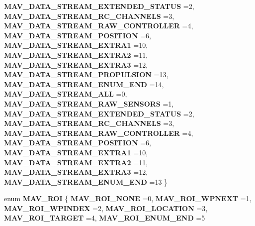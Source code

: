 \begin{DoxyCompactItemize}
\textbf{ M\+A\+V\+\_\+\+D\+A\+T\+A\+\_\+\+S\+T\+R\+E\+A\+M\+\_\+\+E\+X\+T\+E\+N\+D\+E\+D\+\_\+\+S\+T\+A\+T\+US} =2, 
\textbf{ M\+A\+V\+\_\+\+D\+A\+T\+A\+\_\+\+S\+T\+R\+E\+A\+M\+\_\+\+R\+C\+\_\+\+C\+H\+A\+N\+N\+E\+LS} =3, 
\newline
\textbf{ M\+A\+V\+\_\+\+D\+A\+T\+A\+\_\+\+S\+T\+R\+E\+A\+M\+\_\+\+R\+A\+W\+\_\+\+C\+O\+N\+T\+R\+O\+L\+L\+ER} =4, 
\textbf{ M\+A\+V\+\_\+\+D\+A\+T\+A\+\_\+\+S\+T\+R\+E\+A\+M\+\_\+\+P\+O\+S\+I\+T\+I\+ON} =6, 
\textbf{ M\+A\+V\+\_\+\+D\+A\+T\+A\+\_\+\+S\+T\+R\+E\+A\+M\+\_\+\+E\+X\+T\+R\+A1} =10, 
\textbf{ M\+A\+V\+\_\+\+D\+A\+T\+A\+\_\+\+S\+T\+R\+E\+A\+M\+\_\+\+E\+X\+T\+R\+A2} =11, 
\newline
\textbf{ M\+A\+V\+\_\+\+D\+A\+T\+A\+\_\+\+S\+T\+R\+E\+A\+M\+\_\+\+E\+X\+T\+R\+A3} =12, 
\textbf{ M\+A\+V\+\_\+\+D\+A\+T\+A\+\_\+\+S\+T\+R\+E\+A\+M\+\_\+\+P\+R\+O\+P\+U\+L\+S\+I\+ON} =13, 
\textbf{ M\+A\+V\+\_\+\+D\+A\+T\+A\+\_\+\+S\+T\+R\+E\+A\+M\+\_\+\+E\+N\+U\+M\+\_\+\+E\+ND} =14, 
\textbf{ M\+A\+V\+\_\+\+D\+A\+T\+A\+\_\+\+S\+T\+R\+E\+A\+M\+\_\+\+A\+LL} =0, 
\newline
\textbf{ M\+A\+V\+\_\+\+D\+A\+T\+A\+\_\+\+S\+T\+R\+E\+A\+M\+\_\+\+R\+A\+W\+\_\+\+S\+E\+N\+S\+O\+RS} =1, 
\textbf{ M\+A\+V\+\_\+\+D\+A\+T\+A\+\_\+\+S\+T\+R\+E\+A\+M\+\_\+\+E\+X\+T\+E\+N\+D\+E\+D\+\_\+\+S\+T\+A\+T\+US} =2, 
\textbf{ M\+A\+V\+\_\+\+D\+A\+T\+A\+\_\+\+S\+T\+R\+E\+A\+M\+\_\+\+R\+C\+\_\+\+C\+H\+A\+N\+N\+E\+LS} =3, 
\textbf{ M\+A\+V\+\_\+\+D\+A\+T\+A\+\_\+\+S\+T\+R\+E\+A\+M\+\_\+\+R\+A\+W\+\_\+\+C\+O\+N\+T\+R\+O\+L\+L\+ER} =4, 
\newline
\textbf{ M\+A\+V\+\_\+\+D\+A\+T\+A\+\_\+\+S\+T\+R\+E\+A\+M\+\_\+\+P\+O\+S\+I\+T\+I\+ON} =6, 
\textbf{ M\+A\+V\+\_\+\+D\+A\+T\+A\+\_\+\+S\+T\+R\+E\+A\+M\+\_\+\+E\+X\+T\+R\+A1} =10, 
\textbf{ M\+A\+V\+\_\+\+D\+A\+T\+A\+\_\+\+S\+T\+R\+E\+A\+M\+\_\+\+E\+X\+T\+R\+A2} =11, 
\textbf{ M\+A\+V\+\_\+\+D\+A\+T\+A\+\_\+\+S\+T\+R\+E\+A\+M\+\_\+\+E\+X\+T\+R\+A3} =12, 
\newline
\textbf{ M\+A\+V\+\_\+\+D\+A\+T\+A\+\_\+\+S\+T\+R\+E\+A\+M\+\_\+\+E\+N\+U\+M\+\_\+\+E\+ND} =13
 \}
\item 
enum \textbf{ M\+A\+V\+\_\+\+R\+OI} \{ \newline
\textbf{ M\+A\+V\+\_\+\+R\+O\+I\+\_\+\+N\+O\+NE} =0, 
\textbf{ M\+A\+V\+\_\+\+R\+O\+I\+\_\+\+W\+P\+N\+E\+XT} =1, 
\textbf{ M\+A\+V\+\_\+\+R\+O\+I\+\_\+\+W\+P\+I\+N\+D\+EX} =2, 
\textbf{ M\+A\+V\+\_\+\+R\+O\+I\+\_\+\+L\+O\+C\+A\+T\+I\+ON} =3, 
\newline
\textbf{ M\+A\+V\+\_\+\+R\+O\+I\+\_\+\+T\+A\+R\+G\+ET} =4, 
\textbf{ M\+A\+V\+\_\+\+R\+O\+I\+\_\+\+E\+N\+U\+M\+\_\+\+E\+ND} =5

\end{DoxyCompactItemize}
